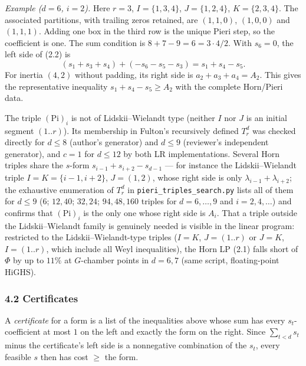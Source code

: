 \documentclass[
  11pt,
  a4paper,
]{article}
\begin{document}
\emph{Example (\(d=6\), \(i=2\)).} Here \(r=3\), \(I=\{1,\allowbreak{}3,\allowbreak{}4\}\),
\(J=\{1,\allowbreak{}2,\allowbreak{}4\}\), \(K=\{2,\allowbreak{}3,\allowbreak{}4\}\). The associated partitions, with
trailing zeros retained, are \((1,\allowbreak{}1,\allowbreak{}0)\), \((1,\allowbreak{}0,\allowbreak{}0)\) and \((1,\allowbreak{}1,\allowbreak{}1)\).
Adding one box in the third row is the unique Pieri step, so the
coefficient is one. The sum condition is \(8+7-9=6=3\cdot4/2\). With
\(s_6=0\), the left side of (2.2) is
\[ (s_1+s_3+s_4)+(-s_6-s_5-s_3)=s_1+s_4-s_5.\] For inertia \((4,\allowbreak{}2)\)
without padding, its right side is \(a_2+a_3+a_4=A_2\). This gives the
representative inequality \(s_1+s_4-s_5\ge A_2\) with the complete
Horn/Pieri data.

The triple \((\mathrm{Pi})_i\) is not of Lidskii--Wielandt type (neither
\(I\) nor \(J\) is an initial segment \((1..r)\)). Its membership in
Fulton's recursively defined \(T^d_r\) was checked directly for
\(d\le 8\) (author's generator) and \(d\le 9\) (reviewer's independent
generator), and \(c=1\) for \(d\le12\) by both LR implementations.
Several Horn triples share the \(s\)-form \(s_{i-1}+s_{i+2}-s_{d-1}\)
--- for instance the Lidskii--Wielandt triple \(I=K=\{i-1,\allowbreak{}i+2\}\),
\(J=(1,\allowbreak{}2)\), whose right side is only \(\lambda_{i-1}+\lambda_{i+2}\);
the exhaustive enumeration of \(T^d_r\) in
{\small\texttt{pieri\_\allowbreak{}triples\_\allowbreak{}search.\allowbreak{}py}} lists all of them for \(d\le9\)
(\(6\); \(12,\allowbreak{}40\); \(32,\allowbreak{}24\); \(94,\allowbreak{}48,\allowbreak{}160\) triples for \(d=6,\allowbreak{}\dots,\allowbreak{}9\)
and \(i=2,\allowbreak{}4,\allowbreak{}\dots\)) and confirms that \((\mathrm{Pi})_i\) is the only
one whose right side is \(A_i\). That a triple outside the
Lidskii--Wielandt family is genuinely needed is visible in the linear
program: restricted to the Lidskii--Wielandt-type triples (\(I=K\),
\(J=(1..r)\) or \(J=K\), \(I=(1..r)\), which include all Weyl
inequalities), the Horn LP (2.1) falls short of \(\Phi\) by up to
\(11\%\) at \(G\)-chamber points in \(d=6,\allowbreak{}7\) (same script,
floating-point HiGHS).

\subsubsection{4.2 Certificates}\label{certificates}

A \emph{certificate} for a form is a list of the inequalities above
whose sum has every \(s_t\)-coefficient at most \(1\) on the left and
exactly the form on the right. Since \(\sum_{t<d}s_t\) minus the
certificate's left side is a nonnegative combination of the \(s_t\),
every feasible \(s\) then has cost \(\ge\) the form.
\end{document}
